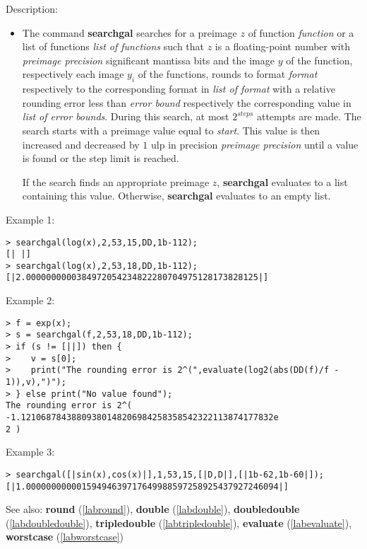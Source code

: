 \noindent Description: \begin{itemize}

\item The command \textbf{searchgal} searches for a preimage $z$ of function
   \emph{function} or a list of functions \emph{list of functions} such that
   $z$ is a floating-point number with \emph{preimage precision}
   significant mantissa bits and the image $y$ of the function,
   respectively each image $y_i$ of the functions, rounds to
   format \emph{format} respectively to the corresponding format in \emph{list of format} 
   with a relative rounding error less than \emph{error bound}
   respectively the corresponding value in \emph{list of error bounds}. During
   this search, at most $2^{steps}$ attempts are made. The search
   starts with a preimage value equal to \emph{start}. This value is then
   increased and decreased by $1$ ulp in precision \emph{preimage precision} 
   until a value is found or the step limit is reached.
    
   If the search finds an appropriate preimage $z$, \textbf{searchgal}
   evaluates to a list containing this value. Otherwise, \textbf{searchgal}
   evaluates to an empty list.
\end{itemize}
\noindent Example 1: 
\begin{center}\begin{minipage}{15cm}\begin{Verbatim}[frame=single]
> searchgal(log(x),2,53,15,DD,1b-112);
[| |]
> searchgal(log(x),2,53,18,DD,1b-112);
[|2.0000000000384972054234822280704975128173828125|]
\end{Verbatim}
\end{minipage}\end{center}
\noindent Example 2: 
\begin{center}\begin{minipage}{15cm}\begin{Verbatim}[frame=single]
> f = exp(x);
> s = searchgal(f,2,53,18,DD,1b-112);
> if (s != [||]) then {
>    v = s[0];
>    print("The rounding error is 2^(",evaluate(log2(abs(DD(f)/f - 1)),v),")");
> } else print("No value found");
The rounding error is 2^( -1.12106878438809380148206984258358542322113874177832e
2 )
\end{Verbatim}
\end{minipage}\end{center}
\noindent Example 3: 
\begin{center}\begin{minipage}{15cm}\begin{Verbatim}[frame=single]
> searchgal([|sin(x),cos(x)|],1,53,15,[|D,D|],[|1b-62,1b-60|]);
[|1.00000000000159494639717649988597258925437927246094|]
\end{Verbatim}
\end{minipage}\end{center}
See also: \textbf{round} (\ref{labround}), \textbf{double} (\ref{labdouble}), \textbf{doubledouble} (\ref{labdoubledouble}), \textbf{tripledouble} (\ref{labtripledouble}), \textbf{evaluate} (\ref{labevaluate}), \textbf{worstcase} (\ref{labworstcase})
